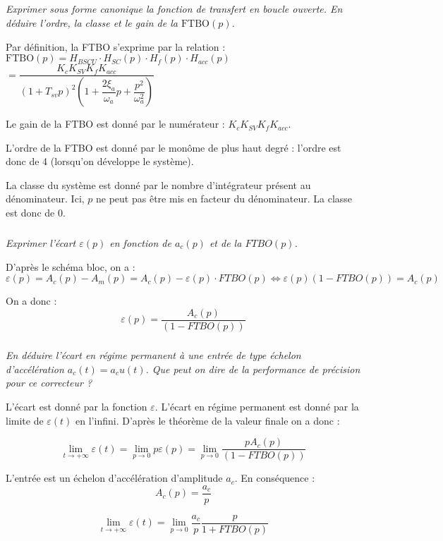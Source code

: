 \begin{multicols}{2}
\subparagraph{}
\textit{Exprimer sous forme canonique la fonction de transfert en boucle ouverte. En déduire
l’ordre, la classe et le gain de la $\text{FTBO}(p)$.}
\ifprof
\begin{corrige}
Par définition, la FTBO s'exprime par la relation :
$
\text{FTBO}(p)=H_{BSCU} \cdot H_{SC}(p) \cdot H_f(p) \cdot H_{acc}(p) $ $=
\dfrac{K_cK_{SV}K_fK_{acc}}{\left( 1+T_{sv}p
\right)^2\left(1+\dfrac{2\xi_a}{\omega_a}p+\dfrac{p^2}{\omega_a^2}\right)}
$

Le gain de la FTBO est donné par le numérateur : $K_cK_{SV}K_fK_{acc}$. 

L'ordre de la FTBO est donné par le monôme de plus haut degré : l'ordre est
donc de 4 (lorsqu'on développe le système).

La classe du système est donné par le nombre d'intégrateur présent au
dénominateur. Ici, $p$ ne peut pas être mis en facteur du dénominateur. La
classe est donc de 0.


\end{corrige}
\else
\fi

\subparagraph{}
\textit{Exprimer l'écart $\varepsilon(p)$ en fonction de $a_c(p)$ et de la $FTBO(p)$.}
\ifprof
\begin{corrige}
D'après le schéma bloc, on a : 
$$
\varepsilon(p) = A_c(p)-A_m(p) =A_c(p)-\varepsilon(p)\cdot FTBO(p)
\Leftrightarrow
\varepsilon(p) \left( 1-FTBO(p)\right) = A_c(p)
$$

On a donc :
$$
\varepsilon(p)  = \dfrac{A_c(p)}{\left( 1-FTBO(p)\right)}
$$

\end{corrige}
\else
\fi

\subparagraph{}
\textit{En déduire l'écart en régime permanent à une entrée de type échelon d'accélération
$a_c (t)=a_cu (t)$. Que peut on dire de la performance de précision pour ce correcteur ?}
\ifprof
\begin{corrige}
L'écart est donné par la fonction $\varepsilon$. L'écart en régime permanent
est donné par la limite de $\varepsilon(t)$ en l'infini. D'après le théorème de
la valeur finale on a donc :

$$
\lim\limits_{t\to +\infty} \varepsilon(t) = \lim\limits_{p\to 0}
p\varepsilon(p) =  \lim\limits_{p\to 0} \dfrac{p A_c(p)}{\left(
1-FTBO(p)\right)}
$$


L'entrée est un échelon d'accélération d'amplitude $a_c$. En conséquence : 
$$A_c (p)=\dfrac{a_c}{p}$$

$$
\lim\limits_{t\to +\infty} \varepsilon(t) = \lim\limits_{p\to 0}
\dfrac{a_c}{p} \dfrac{p}{1+FTBO(p)}
$$


\end{corrige}
\end{multicols}
